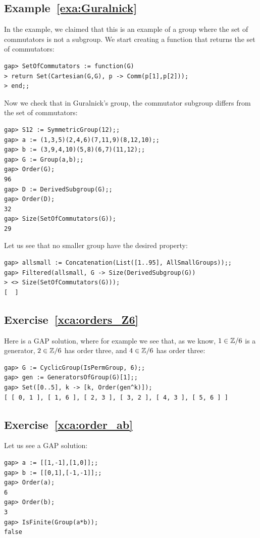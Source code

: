\subsection*{Example~\ref{exa:Guralnick}}
\label{gap:Guralnick}

In the example, we claimed that
this is an example of a group where the set of commutators is not a subgroup. We
start creating a function that returns the set of commutators:
\begin{lstlisting}
gap> SetOfCommutators := function(G)
> return Set(Cartesian(G,G), p -> Comm(p[1],p[2]));
> end;;
\end{lstlisting}
Now we check that in Guralnick's group, the commutator subgroup
differs from the set of commutators:
\begin{lstlisting}
gap> S12 := SymmetricGroup(12);;
gap> a := (1,3,5)(2,4,6)(7,11,9)(8,12,10);;
gap> b := (3,9,4,10)(5,8)(6,7)(11,12);;
gap> G := Group(a,b);;
gap> Order(G);
96
gap> D := DerivedSubgroup(G);;
gap> Order(D);
32
gap> Size(SetOfCommutators(G));
29
\end{lstlisting}
Let us see that no smaller group
have the desired property:
\begin{lstlisting}
gap> allsmall := Concatenation(List([1..95], AllSmallGroups));;
gap> Filtered(allsmall, G -> Size(DerivedSubgroup(G))
> <> Size(SetOfCommutators(G)));
[  ]
\end{lstlisting}



\subsection*{Exercise~\ref{xca:orders_Z6}}

Here is a GAP solution, where for example we see that, as we know,
$1\in\mathbb{Z}/6$ is a generator,
$2\in\mathbb{Z}/6$ has order three, and $4\in\mathbb{Z}/6$ has order three:
\begin{lstlisting}
gap> G := CyclicGroup(IsPermGroup, 6);;
gap> gen := GeneratorsOfGroup(G)[1];;
gap> Set([0..5], k -> [k, Order(gen^k)]);
[ [ 0, 1 ], [ 1, 6 ], [ 2, 3 ], [ 3, 2 ], [ 4, 3 ], [ 5, 6 ] ]
\end{lstlisting}

\subsection*{Exercise~\ref{xca:order_ab}}

Let us see a GAP solution:
\begin{lstlisting}
gap> a := [[1,-1],[1,0]];;
gap> b := [[0,1],[-1,-1]];;
gap> Order(a);
6
gap> Order(b);
3
gap> IsFinite(Group(a*b));
false
\end{lstlisting}


